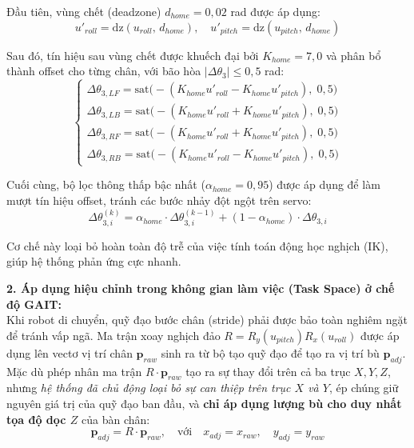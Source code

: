 Đầu tiên, vùng chết (deadzone) $d_{home} = 0{,}02$ rad được áp dụng:
\begin{equation}
u'_{roll} = \mathrm{dz}(u_{roll},\, d_{home}), \quad u'_{pitch} = \mathrm{dz}(u_{pitch},\, d_{home})
\end{equation}

Sau đó, tín hiệu sau vùng chết được khuếch đại bởi $K_{home} = 7{,}0$ và phân bổ thành offset cho từng chân, với bão hòa $|\Delta\theta_3| \leq 0{,}5$ rad:
\begin{equation}
\begin{cases} 
\Delta\theta_{3,LF} = \mathrm{sat}\big(- (K_{home} u'_{roll} - K_{home} u'_{pitch}),\; 0{,}5\big) \\
\Delta\theta_{3,LB} = \mathrm{sat}\big(- (K_{home} u'_{roll} + K_{home} u'_{pitch}),\; 0{,}5\big) \\
\Delta\theta_{3,RF} = \mathrm{sat}\big(- (K_{home} u'_{roll} + K_{home} u'_{pitch}),\; 0{,}5\big) \\
\Delta\theta_{3,RB} = \mathrm{sat}\big(- (K_{home} u'_{roll} - K_{home} u'_{pitch}),\; 0{,}5\big) 
\end{cases} \tag{5}
\end{equation}

Cuối cùng, bộ lọc thông thấp bậc nhất ($\alpha_{home} = 0{,}95$) được áp dụng để làm mượt tín hiệu offset, tránh các bước nhảy đột ngột trên servo:
\begin{equation}
\Delta\theta_{3,i}^{(k)} = \alpha_{home} \cdot \Delta\theta_{3,i}^{(k-1)} + (1 - \alpha_{home}) \cdot \Delta\theta_{3,i}
\end{equation}

Cơ chế này loại bỏ hoàn toàn độ trễ của việc tính toán động học nghịch (IK), giúp hệ thống phản ứng cực nhanh.

\textbf{2. Áp dụng hiệu chỉnh trong không gian làm việc (Task Space) ở chế độ GAIT:} \\
Khi robot di chuyển, quỹ đạo bước chân (stride) phải được bảo toàn nghiêm ngặt để tránh vấp ngã. Ma trận xoay nghịch đảo $R = R_y(u_{pitch}) R_x(u_{roll})$ được áp dụng lên vectơ vị trí chân $\mathbf{p}_{raw}$ sinh ra từ bộ tạo quỹ đạo để tạo ra vị trí bù $\mathbf{p}_{adj}$. Mặc dù phép nhân ma trận $R \cdot \mathbf{p}_{raw}$ tạo ra sự thay đổi trên cả ba trục $X, Y, Z$, nhưng \textit{hệ thống đã chủ động loại bỏ sự can thiệp trên trục $X$ và $Y$}, ép chúng giữ nguyên giá trị của quỹ đạo ban đầu, và \textbf{chỉ áp dụng lượng bù cho duy nhất tọa độ dọc $Z$} của bàn chân:
\begin{equation}
\mathbf{p}_{adj} = R \cdot \mathbf{p}_{raw}, \quad \text{với} \quad x_{adj} = x_{raw}, \quad y_{adj} = y_{raw} \tag{6}
\end{equation}

